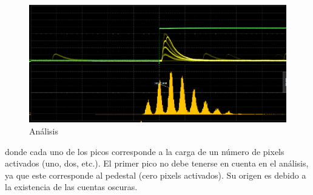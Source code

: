 \begin{figure}[hbtp]
 \centering
 \includegraphics[scale=0.4]{Analisis.png}
 \caption{Análisis\label{analisis}}
 \end{figure}
donde cada uno de los picos corresponde a la carga de un número de pixels activados (uno, dos, etc.). El primer pico no debe tenerse en cuenta en el análisis, ya que este corresponde al pedestal (cero pixels activados). Su origen es debido a la existencia de las cuentas oscuras.
 
